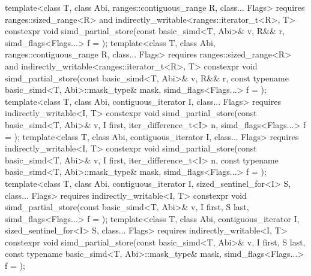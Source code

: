 \begin{itemdecl}
template<class T, class Abi, ranges::contiguous_range R, class... Flags>
  requires ranges::sized_range<R> and indirectly_writable<ranges::iterator_t<R>, T>
  constexpr void simd_partial_store(const basic_simd<T, Abi>& v, R&& r, simd_flags<Flags...> f = {});
template<class T, class Abi, ranges::contiguous_range R, class... Flags>
  requires ranges::sized_range<R> and indirectly_writable<ranges::iterator_t<R>, T>
  constexpr void simd_partial_store(const basic_simd<T, Abi>& v, R&& r,
                          const typename basic_simd<T, Abi>::mask_type& mask,
                          simd_flags<Flags...> f = {});
template<class T, class Abi, contiguous_iterator I, class... Flags>
  requires indirectly_writable<I, T>
  constexpr void simd_partial_store(const basic_simd<T, Abi>& v, I first, iter_difference_t<I> n,
                          simd_flags<Flags...> f = {});
template<class T, class Abi, contiguous_iterator I, class... Flags>
  requires indirectly_writable<I, T>
  constexpr void simd_partial_store(const basic_simd<T, Abi>& v, I first, iter_difference_t<I> n,
                          const typename basic_simd<T, Abi>::mask_type& mask,
                          simd_flags<Flags...> f = {});
template<class T, class Abi, contiguous_iterator I, sized_sentinel_for<I> S, class... Flags>
  requires indirectly_writable<I, T>
  constexpr void simd_partial_store(const basic_simd<T, Abi>& v, I first, S last, simd_flags<Flags...> f = {});
template<class T, class Abi, contiguous_iterator I, sized_sentinel_for<I> S, class... Flags>
  requires indirectly_writable<I, T>
  constexpr void simd_partial_store(const basic_simd<T, Abi>& v, I first, S last,
                          const typename basic_simd<T, Abi>::mask_type& mask,
                          simd_flags<Flags...> f = {});
\end{itemdecl}
